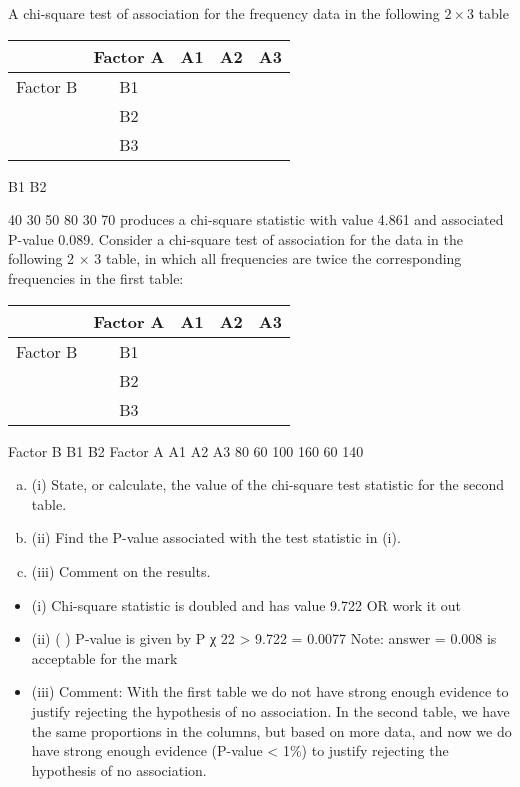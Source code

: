 \documentclass[a4paper,12pt]{article}
\begin{document}
A chi-square test of association for the frequency data in the following $2 × 3$ table

\begin{center}
\begin{tabular}{|c|c||c|c|c} \hline
 & Factor A & A1 & A2 & A3 \\   \hline 
Factor B &  B1  &  &  &  \\ \hline
&  B2  &  &  &  \\ \hline
&  B3  &  &  &  \\ \hline
\end{tabular}
\end{center}

B1
B2

40
30
50
80
30
70
produces a chi-square statistic with value 4.861 and associated P-value 0.089.
Consider a chi-square test of association for the data in the following 2 × 3 table, in
which all frequencies are twice the corresponding frequencies in the first table:
\begin{center}
\begin{tabular}{|c|c||c|c|c} \hline
 & Factor A & A1 & A2 & A3 \\   \hline 
Factor B &  B1  &  &  &  \\ \hline
&  B2  &  &  &  \\ \hline
&  B3  &  &  &  \\ \hline
\end{tabular}
\end{center}
Factor B
B1
B2
Factor A
A1
A2
A3
80
60
100
160
60
140
\begin{enumerate}[(a)]
\item (i) State, or calculate, the value of the chi-square test statistic for the second table.

\item(ii) Find the P-value associated with the test statistic in (i).
\item(iii) Comment on the results.
\end{enumerate}

\begin{itemize}
\item (i)
Chi-square statistic is doubled and has value 9.722
OR work it out
\item (ii)
(
)
P-value is given by P χ 22 > 9.722 = 0.0077
Note: answer = 0.008 is acceptable for the mark
\item (iii) Comment: With the first table we do not have strong enough evidence to
justify rejecting the hypothesis of no association. In the second table, we have
the same proportions in the columns, but based on more data, and now we do
have strong enough evidence (P-value < 1\%) to justify rejecting the
hypothesis of no association.
\end{itemize}
\end{document}
